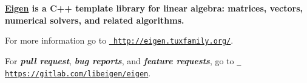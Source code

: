 {\bfseries{\mbox{\hyperlink{namespace_eigen}{Eigen}} is a C++ template library for linear algebra\+: matrices, vectors, numerical solvers, and related algorithms.}}

For more information go to \href{http://eigen.tuxfamily.org/}{\texttt{ http\+://eigen.\+tuxfamily.\+org/}}.

For {\itshape {\bfseries{pull request}}}, {\itshape {\bfseries{bug reports}}}, and {\itshape {\bfseries{feature requests}}}, go to \href{https://gitlab.com/libeigen/eigen}{\texttt{ https\+://gitlab.\+com/libeigen/eigen}}. 